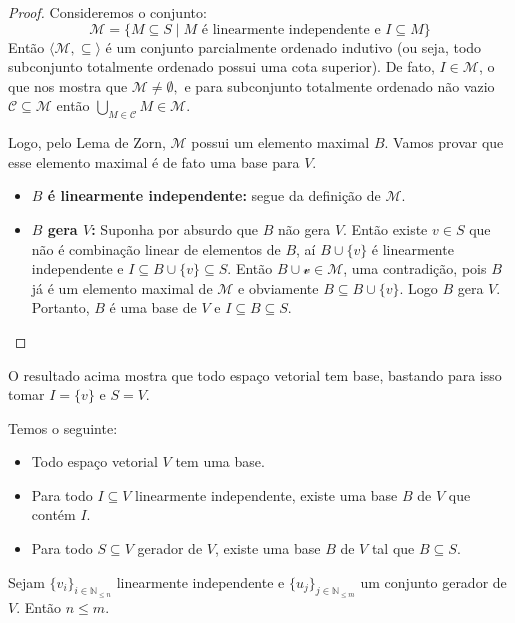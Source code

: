 \documentclass[11pt,twoside,a4paper]{book}
\begin{document}
\begin{proof}
Consideremos o conjunto:
\[
\mathcal{M}=\{M\subseteq S\mid M\text{ é linearmente independente e }I\subseteq M\}
\]
Então $\langle \mathcal{M},\subseteq \rangle$ é um conjunto parcialmente ordenado indutivo (ou seja, todo subconjunto totalmente ordenado possui uma cota superior). De fato, $I\in\mathcal{M}$, o que nos mostra que $\mathcal{M} \neq \emptyset,$ e para subconjunto totalmente ordenado não vazio $\mathcal{C}\subseteq\mathcal{M}$ então $\bigcup\limits_{M \in \mathcal{C}} M \in\mathcal{M}.$ 

Logo, pelo Lema de Zorn, $\mathcal{M}$ possui um elemento maximal $B$. Vamos provar que esse elemento maximal é de fato uma base para $V.$
\begin{itemize}
    \item \textbf{$B$ é linearmente independente:} segue da definição de $\mathcal{M}.$
    \item \textbf{$B$ gera $V$:} Suponha por absurdo que $B$ não gera $V$. Então existe $v\in S$ que não é combinação linear de elementos de $B$, aí $B\cup\{v\}$ é linearmente independente e $I\subseteq B\cup\{v\}\subseteq S$. Então $B\cup\mathcal{v}\in\mathcal{M}$, uma contradição, pois $B$ já é um elemento maximal de $\mathcal{M}$ e obviamente $B \subseteq B \cup \{ v \}$. Logo $B$ gera $V$. Portanto, $B$ é uma base de $V$ e $I\subseteq B\subseteq S$.
    \end{itemize}
\end{proof}

O resultado acima mostra que todo espaço vetorial tem base, bastando para isso tomar $I = \{ v \}$ e $S = V.$
\begin{corolario}
Temos o seguinte:
\begin{itemize}
\item Todo espaço vetorial $V$ tem uma base.
\item Para todo $I\subseteq V$ linearmente independente, existe uma base $B$ de $V$ que contém $I$.
\item Para todo $S\subseteq V$ gerador de $V$, existe uma base $B$ de $V$ tal que $B\subseteq S$.
\end{itemize}
\end{corolario}


\begin{lema}
Sejam $\{v_i\}_{i \in \mathbb{N}_{\le n}}$ linearmente independente e $\{u_j\}_{j\in \mathbb{N}_{\le m}}$ um conjunto gerador de $V$. Então $n\leq m$.
\end{lema}
\end{document}
